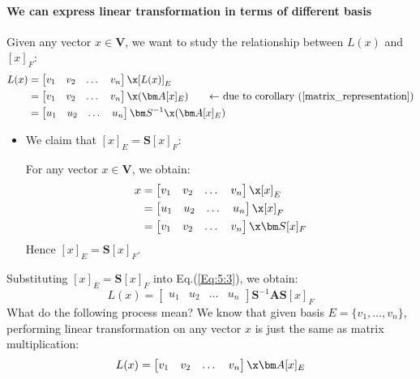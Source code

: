 \paragraph{We can express linear transformation in terms of different basis}
Given any vector $x\in\bm V$, we want to study the relationship between $L(x)$ and $[x]_{F}$:
\begin{equation}
\begin{aligned}
L(x)  	&=	\begin{bmatrix}v_1&v_2&\dots&v_n\end{bmatrix}\x [L(x)]_{E}\\
	    	&= \begin{bmatrix}v_1&v_2&\dots&v_n\end{bmatrix}\x (\bm A[x]_{E})\qquad\text{$\leftarrow$ due to corollary (\ref{matrix_representation})}
	    	\\
	    	&= \begin{bmatrix}u_1&u_2&\dots&u_n\end{bmatrix}\bm S^{-1}\x (\bm A[x]_{E})\\
\end{aligned}\label{Eq:5:3}
\end{equation}
\begin{itemize}
\item
We claim that $[x]_{E}=\bm S[x]_{F}$:

For any vector $x\in\bm V$, we obtain:
\[
\begin{aligned}
x &=\begin{bmatrix}v_1&v_2&\dots&v_n\end{bmatrix}\x [x]_{E}\\
&=\begin{bmatrix}u_1&u_2&\dots&u_n\end{bmatrix}\x [x]_{F}\\
&= \begin{bmatrix}v_1&v_2&\dots&v_n\end{bmatrix}\x \bm S[x]_{F}
\end{aligned}
\]
Hence $[x]_{E}=\bm S[x]_{F}$.
\end{itemize}

Substituting $[x]_{E}=\bm S[x]_{F}$ into Eq.(\ref{Eq:5:3}), we obtain:
\[
L(x)=\begin{bmatrix}u_1&u_2&\dots&u_n\end{bmatrix}\bm S^{-1}\bm A\bm S[x]_{F}
\]
What do the following process mean? We know that given basis $E=\{v_1,\dots,v_n\}$, performing linear transformation on any vector $x$ is just the same as matrix multiplication:
\[
L(x)=\begin{bmatrix}v_1&v_2&\dots&v_n\end{bmatrix}\x \bm A[x]_{E}
\]

